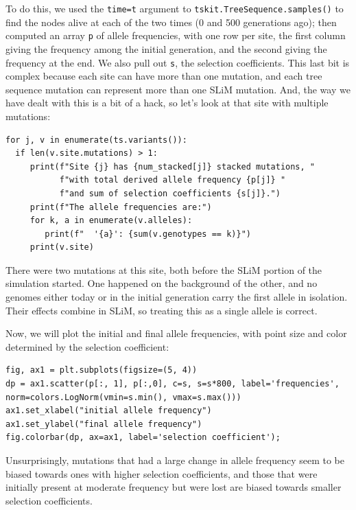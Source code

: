 \documentclass[12pt]{article}
\begin{document}
To do this, we used the \verb|time=t| argument to \verb|tskit.TreeSequence.samples()| to find the nodes alive at each of the two times (0 and 500 generations ago);
then computed an array \verb|p| of allele frequencies, with one row per site,
the first column giving the frequency among the initial generation,
and the second giving the frequency at the end.
We also pull out \verb|s|, the selection coefficients.
This last bit is complex because each site can have more than one mutation,
and each tree sequence mutation can represent more than one SLiM mutation.
And, the way we have dealt with this is a bit of a hack, so let’s look at that site with multiple mutations:

\begin{listing}[H]
    \begin{verbatim}
for j, v in enumerate(ts.variants()):
  if len(v.site.mutations) > 1:
     print(f"Site {j} has {num_stacked[j]} stacked mutations, "
           f"with total derived allele frequency {p[j]} "
           f"and sum of selection coefficients {s[j]}.")
     print(f"The allele frequencies are:")
     for k, a in enumerate(v.alleles):
        print(f"  '{a}': {sum(v.genotypes == k)}")
     print(v.site)
    \end{verbatim}
\end{listing}

There were two mutations at this site, both before the SLiM portion of the simulation started.
One happened on the background of the other, and no genomes either today or in the initial generation carry the first allele in isolation.
Their effects combine in SLiM, so treating this as a single allele is correct.

Now, we will plot the initial and final allele frequencies, with point size and color determined by the selection coefficient:

\begin{listing}[H]
    \begin{verbatim}
fig, ax1 = plt.subplots(figsize=(5, 4))
dp = ax1.scatter(p[:, 1], p[:,0], c=s, s=s*800, label='frequencies', norm=colors.LogNorm(vmin=s.min(), vmax=s.max()))
ax1.set_xlabel("initial allele frequency")
ax1.set_ylabel("final allele frequency")
fig.colorbar(dp, ax=ax1, label='selection coefficient');
    \end{verbatim}
\end{listing}

Unsurprisingly, mutations that had a large change in allele frequency seem to be biased towards ones with higher selection coefficients,
and those that were initially present at moderate frequency but were lost are biased towards smaller selection coefficients.
\end{document}
